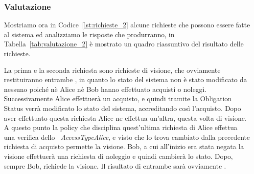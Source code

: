 \subsubsection{Valutazione}
Mostriamo ora in Codice~\ref{lst:richieste_2} alcune richieste che possono essere fatte al sistema ed analizziamo le risposte che produrranno, in Tabella~\ref{tab:valutazione_2} è mostrato un quadro riassuntivo del risultato delle richieste.

La prima e la seconda richiesta sono richieste di visione, che ovviamente restituiranno entrambe \deny, in quanto lo stato del sistema non è stato modificato da nessuno poiché nè Alice nè Bob hanno effettuato acquisti o noleggi.
Successivamente Alice effettuerà un acquisto, e quindi tramite la Obligation Status verrà modificato lo stato del sistema, accreditando così l'acquisto. Dopo aver effettuato questa richiesta Alice ne effettua un'altra, questa volta di visione. 
A questo punto la policy che disciplina quest'ultima richiesta di Alice effettua una verifica dello \statusattribute \ \textit{AccessTypeAlice}, e visto che lo trova cambiato dalla precedente richiesta di acquisto permette la visione.
Bob, a cui all'inizio era stata negata la visione effettuerà una richiesta di noleggio e quindi cambierà lo stato. Dopo, sempre Bob, richiede la visione. Il risultato di entrambe sarà ovviamente \permit.

